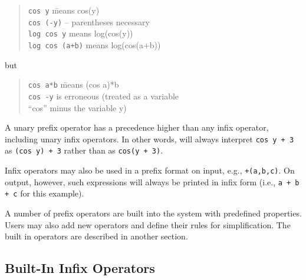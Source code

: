 \begin{quote}
\begin{tabbing}
{\tt cos y} \hspace{1.75in} \= means cos(y) \\
{\tt cos (-y)} \> -- parentheses necessary \\
{\tt log cos y} \>   means log(cos(y)) \\
{\tt log cos (a+b)} \> means log(cos(a+b))
\end{tabbing}
\end{quote}
but
\begin{quote}
\begin{tabbing}
{\tt cos a*b} \hspace{1.6in} \= means (cos a)*b \\
{\tt cos -y}  \> is erroneous (treated as a variable \\
\> ``cos'' minus the variable y)
\end{tabbing}
\end{quote}
A unary prefix operator has a precedence
 higher than any infix operator, including
unary infix operators. 
In other words, {\REDUCE} will always interpret {\tt cos~y + 3} as
{\tt (cos~y) + 3} rather than as {\tt cos(y + 3)}.

Infix operators may also be used in a prefix format on input, e.g.,
{\tt +(a,b,c)}.  On output, however, such expressions will always be
printed in infix form (i.e., {\tt a + b + c} for this example).

A number of prefix operators are built into the system with predefined
properties. Users may also add new operators and define their rules for
simplification. The built in operators are described in another section.

\subsection*{Built-In Infix Operators}
\hypertarget{operator:MEMBER}{}
\hypertarget{operator:MEMQ}{}
\hypertarget{operator:EQ}{}
\hypertarget{operator:NEQ}{}
\hypertarget{reserved:plusop}{}
\hypertarget{reserved:minusop}{}
\hypertarget{reserved:timesop}{}
\hypertarget{reserved:quotientop}{}
\hypertarget{reserved:caretop}{}
\hypertarget{reserved:exptop}{}
\hypertarget{reserved:greaterop}{}
\hypertarget{reserved:lessop}{}
\hypertarget{reserved:geqop}{}
\hypertarget{reserved:leqop}{}
\hypertarget{reserved:equalop}{}

